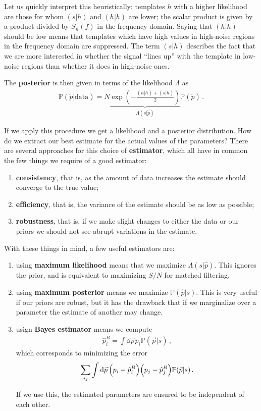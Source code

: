 \documentclass[main.tex]{subfiles}
\begin{document}
Let us quickly interpret this heuristically: templates \(h\) with a higher likelihood are those for whom \((s|h)\) and \((h|h)\) are lower; the scalar product is given by a product divided by \(S_n(f)\) in the frequency domain. 
Saying that \((h|h)\) should be low means that templates which have high values in high-noise regions in the frequency domain are suppressed. 
The term \((s|h)\) describes the fact that we are more interested in whether the signal ``lines up'' with the template in low-noise regions than whether it does in high-noise ones.

The \textbf{posterior} is then given in terms of the likelihood \(\Lambda \) as
%
\begin{align}
\mathbb{P}(\widetilde{p} | \text{data}) = 
N \underbrace{\exp(- \frac{(h | h) + (s | h)}{2})}_{\Lambda (s | \widetilde{p})} \mathbb{P}(\widetilde{p})
\,.
\end{align}

If we apply this procedure we get a likelihood and a posterior distribution. How do we extract our best estimate for the actual values of the parameters? There are several approaches for this choice of \textbf{estimator}, which all have in common the few things we require of a good estimator: 
\begin{enumerate}
    \item \textbf{consistency}, that is, as the amount of data increases the estimate should converge to the true value;
    \item \textbf{efficiency}, that is, the variance of the estimate should be as low as possible;
    \item \textbf{robustness}, that is, if we make slight changes to either the data or our priors we should not see abrupt variations in the estimate. 
\end{enumerate}

With these things in mind, a few useful estimators are:
\begin{enumerate}
    \item using \textbf{maximum likelihood} means that we maximize \(\Lambda (s | \hat{p})\).
    This ignores the prior, and is equivalent to maximizing \(S / N\) for matched filtering. 
    \item using \textbf{maximum posterior} means we maximize \(\mathbb{P}(\hat{p} | s)\).
    This is very useful if our priors are robust, but it has the drawback that if we marginalize over a parameter the estimate of another may change.  
    \item usign \textbf{Bayes estimator} means we compute 
    \begin{align}
    \hat{p}_{i}^{B} = \int \dd{\vec{p}} p_{i} \mathbb{P}(\vec{p} | s)
    \,,
    \end{align}
    which corresponds to minimizing the error 
    \begin{align}
    \sum _{ij} \int \dd{\vec{p}} 
    \qty(p_i - \hat{p}^{B}_{i})
    \qty(p_j - \hat{p}^{B}_{j})
    \mathbb{P}(\vec{p} | s)
    \,.
    \end{align}
    
    If we use this, the estimated parameters are ensured to be independent of each other. 
\end{enumerate}
\end{document}
